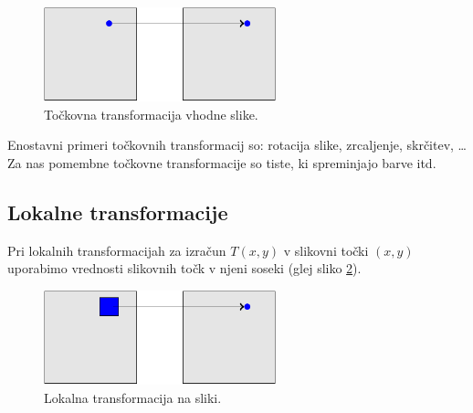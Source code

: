 %
\begin{figure}[htbp]
  \centering
  \includegraphics[width=0.6\textwidth]{./slike-latex/tockovnaT}
  \caption{Točkovna transformacija vhodne slike.}
  \label{fig:tockovnaT}
\end{figure}
%

Enostavni primeri točkovnih transformacij so: rotacija slike, zrcaljenje, skrčitev, \ldots %
Za nas pomembne točkovne transformacije so tiste, ki spreminjajo barve itd. %
\subsection{Lokalne transformacije}\label{sec:LokalneTransformacije}
%
Pri lokalnih transformacijah za izračun $T(x, y)$ v slikovni točki $(x, y)$ uporabimo vrednosti slikovnih točk v njeni soseki (glej sliko \ref{fig:lokalnaT}).

%
\begin{figure}[htbp]
  \centering
  \includegraphics[width=0.6\textwidth]{./slike-latex/lokalnaT}
  \caption{Lokalna transformacija na sliki.}
  \label{fig:lokalnaT}
\end{figure}
%


